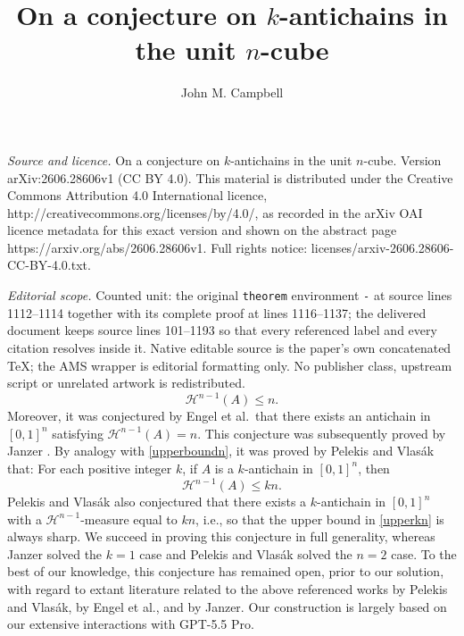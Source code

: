 \documentclass[10pt,a4paper]{amsart}
\begin{document}
\title[On a conjecture on k-antichains in the unit n-cube]{On a conjecture on $k$-antichains in the unit $n$-cube}
\author{John M. Campbell}
\date{}
\maketitle
\noindent\emph{Source and licence.} On a conjecture on $k$-antichains in the unit $n$-cube. Version arXiv:2606.28606v1 (CC BY 4.0). This material is distributed under the Creative Commons Attribution 4.0 International licence, http://creativecommons.org/licenses/by/4.0/, as recorded in the arXiv OAI licence metadata for this exact version and shown on the abstract page https://arxiv.org/abs/2606.28606v1. Full rights notice: licenses/arxiv-2606.28606-CC-BY-4.0.txt.\par\smallskip
\noindent\textit{Editorial scope.} Counted unit: the original \texttt{theorem} environment \texttt{-} at source lines 1112--1114 together with its complete proof at lines 1116--1137; the delivered document keeps source lines 101--1193 so that every referenced label and every citation resolves inside it. Native editable source is the paper's own concatenated TeX; the AMS wrapper is editorial formatting only. No publisher class, upstream script or unrelated artwork is redistributed.
\begin{equation}\label{upperboundn}
 \mathcal{H}^{n-1}(A) \leq n. 
\end{equation}
 Moreover, it was conjectured by Engel et al.\ that there exists an antichain in $[0, 1]^{n}$ satisfying $\mathcal{H}^{n-1}(A) = n$. This conjecture was subsequently proved by Janzer 
 \cite{Janzer2020}. By analogy with \eqref{upperboundn}, it was proved by Pelekis and Vlas\'{a}k \cite{PelekisVlasak2020} that: For each positive integer $k$, if $A$ is a $k$-antichain 
 in $[0, 1]^{n}$, then
\begin{equation}\label{upperkn} 
 \mathcal{H}^{n-1}(A) \leq k n. 
\end{equation}
 Pelekis and Vlas\'{a}k also conjectured that there exists a $k$-antichain in $[0, 1]^{n}$ with a $\mathcal{H}^{n-1}$-measure equal to $kn$, i.e., so that the upper bound in 	 
 \eqref{upperkn} is always sharp. We succeed in proving this conjecture in full generality, whereas Janzer solved the $k = 1$ case and Pelekis and Vlas\'{a}k solved the $n = 2$ case. To the 
 best of our knowledge, this conjecture has remained open, prior to our solution, with regard to extant literature related to 
 the above referenced works by Pelekis and Vlas\'{a}k, by Engel et al., and by Janzer. 
 Our construction is largely based on our extensive interactions with GPT-5.5 Pro. 
\end{document}

